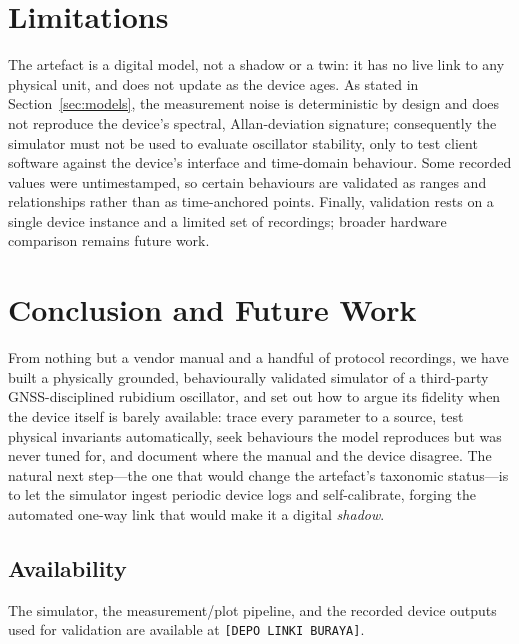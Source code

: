 \documentclass[conference]{IEEEtran}
\begin{document}
\section{Limitations}
The artefact is a digital model, not a shadow or a twin: it has no live
link to any physical unit, and does not update as the device ages. As
stated in Section~\ref{sec:models}, the measurement noise is
deterministic by design and does not reproduce the device's spectral,
Allan-deviation signature; consequently the simulator must not be used
to evaluate oscillator stability, only to test client software against
the device's interface and time-domain behaviour. Some recorded values
were untimestamped, so certain behaviours are validated as ranges and
relationships rather than as time-anchored points. Finally, validation
rests on a single device instance and a limited set of recordings;
broader hardware comparison remains future work.

\section{Conclusion and Future Work}
From nothing but a vendor manual and a handful of protocol recordings,
we have built a physically grounded, behaviourally validated simulator
of a third-party GNSS-disciplined rubidium oscillator, and set out how
to argue its fidelity when the device itself is barely available: trace
every parameter to a source, test physical invariants automatically,
seek behaviours the model reproduces but was never tuned for, and
document where the manual and the device disagree. The natural next
step---the one that would change the artefact's taxonomic status---is to
let the simulator ingest periodic device logs and self-calibrate,
forging the automated one-way link that would make it a digital
\emph{shadow}.

\subsection*{Availability}
The simulator, the measurement/plot pipeline, and the recorded device
outputs used for validation are available at
\texttt{[DEPO LINKI BURAYA]}.



\end{document}

